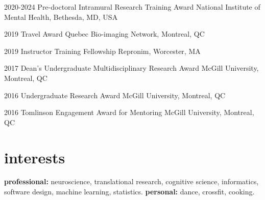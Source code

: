 \documentclass[]{friggeri-cv} %
\begin{document}
\begin{entrylist}
\vspace{-7pt}

\entry
{2020-2024}
{Pre-doctoral Intramural Research Training Award}
{National Institute of Mental Health, Bethesda, MD, USA}
{}
\vspace{-7pt}

\entry
{2019}
{Travel Award}
{Quebec Bio-imaging Network, Montreal, QC}
{}
\vspace{-7pt}

\entry
{2019}
{Instructor Training Fellowship}
{Repronim, Worcester, MA}
{}
\vspace{-7pt}

\entry
{2017}
{Dean's Undergraduate Multidisciplinary Research Award}
{McGill University, Montreal, QC}
{}
\vspace{-7pt}

\entry
{2016}
{Undergraduate Research Award}
{McGill University, Montreal, QC}
{}
\vspace{-7pt}

\entry
{2016}
{Tomlinson Engagement Award for Mentoring}
{McGill University, Montreal, QC}
{}
\vspace{-7pt}

\end{entrylist}


\vspace{-7pt}
\section{interests}

\textbf{professional:} neuroscience, translational research, cognitive science,
informatics, software design, machine learning, statistics.
\textbf{personal:} dance, crossfit, cooking.

\end{document}
